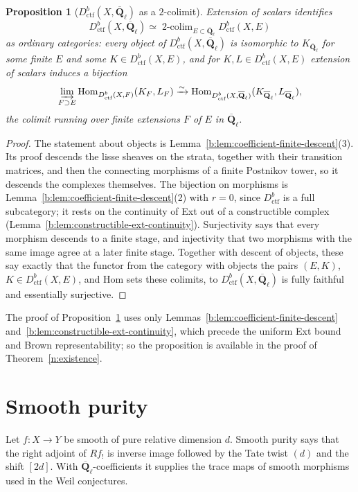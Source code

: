\documentclass[11pt,a4paper]{article}
\numberwithin{equation}{section}
\newtheorem{proposition}[theorem]{Proposition}
\theoremstyle{definition}
\theoremstyle{remark}
\newcommand{\Qbar}{\overline{\mathbf Q}_\ell}
\newcommand{\Hom}{\operatorname{Hom}}
\newcommand{\Dctf}{D^b_{\mathrm{ctf}}}
\begin{document}
\begin{proposition}[$\Dctf(X,\Qbar)$ as a $2$-colimit]
\label{n:two-colimit}
Extension of scalars identifies
\[
 \Dctf(X,\Qbar)\simeq\mathop{\text{2-colim}}_{E\subset\Qbar}\Dctf(X,E)
\]
as ordinary categories: every object of $\Dctf(X,\Qbar)$ is isomorphic to
$K_{\Qbar}$ for some finite $E$ and some $K\in\Dctf(X,E)$, and for
$K,L\in\Dctf(X,E)$ extension of scalars induces a bijection
\[
 \varinjlim_{F\supset E}\Hom_{\Dctf(X,F)}(K_F,L_F)
       \xrightarrow{\sim}\Hom_{\Dctf(X,\Qbar)}(K_{\Qbar},L_{\Qbar}),
\]
the colimit running over finite extensions $F$ of $E$ in $\Qbar$.
\end{proposition}
\begin{proof}
The statement about objects is
Lemma~\ref{b:lem:coefficient-finite-descent}(3). Its proof descends the
lisse sheaves on the strata, together with their transition matrices,
and then the connecting morphisms of a finite Postnikov tower, so it
descends the complexes themselves. The bijection
on morphisms is Lemma~\ref{b:lem:coefficient-finite-descent}(2) with
$r=0$, since $\Dctf$ is a full subcategory; it rests on the continuity of
Ext out of a constructible complex
(Lemma~\ref{b:lem:constructible-ext-continuity}). Surjectivity says that
every morphism descends to a finite stage, and injectivity that two
morphisms with the same image agree at a later finite stage. Together
with descent of objects, these say exactly that the functor from the
category with objects the pairs $(E,K)$, $K\in\Dctf(X,E)$, and Hom sets
these colimits, to $\Dctf(X,\Qbar)$ is fully faithful and essentially
surjective.
\end{proof}

The proof of Proposition~\ref{n:two-colimit} uses only
Lemmas~\ref{b:lem:coefficient-finite-descent}
and~\ref{b:lem:constructible-ext-continuity}, which precede the uniform
Ext bound and Brown representability; so the proposition is available
in the proof of Theorem~\ref{n:existence}.

\section{Smooth purity}\label{sec:smooth-purity}

Let $f:X\to Y$ be smooth of pure relative dimension $d$. Smooth purity
says that the right adjoint of $Rf_!$ is inverse image followed by the
Tate twist $(d)$ and the shift $[2d]$. With $\Qbar$-coefficients it
supplies the trace maps of smooth morphisms used in the Weil
conjectures.
\end{document}
